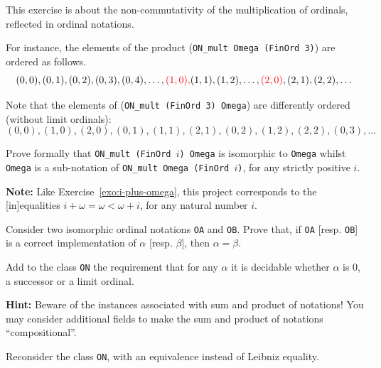 \label{exo:ON-mult}
\begin{project}

This exercise is about the non-commutativity of the multiplication of ordinals, reflected in ordinal notations.

For instance, the
elements of the product (\texttt{ON\_mult Omega (FinOrd 3)}) are ordered as follows.
\[(0,0),(0,1),(0,2),(0,3),(0,4),\dots,{\color{red}(1,0),} (1,1),(1,2),\dots, {\color{red}(2,0)},(2,1),(2,2),\dots\]

Note that the elements of  (\texttt{ON\_mult (FinOrd 3) Omega}) are differently ordered (without limit ordinals):
\[(0,0),(1,0),(2,0),(0,1),(1,1),(2,1),(0,2),(1,2),(2,2),(0,3),\dots\]


Prove formally  that \texttt{ON\_mult (FinOrd $i$) Omega} is isomorphic to
\texttt{Omega}  whilst
\texttt{Omega}  is a sub-notation of \texttt{ON\_mult Omega (FinOrd $i$)},
for any strictly positive $i$. 

\textbf{Note:} Like Exercise~\ref{exo:i-plus-omega}, this project corresponds to the [in]equalities $i+\omega=\omega<\omega+i$, for any natural number $i$.
\end{project}

\begin{project}
Consider two isomorphic ordinal notations \texttt{OA} and \texttt{OB}.
Prove that, if \texttt{OA} [resp. \texttt{OB}] is a correct implementation 
of $\alpha$ [resp. $\beta$], then $\alpha=\beta$.
\end{project}


\begin{project}
\label{project:succ-limit-dec}
Add to the class \texttt{ON} the requirement that for any $\alpha$ it is decidable whether $\alpha$ is $0$, a successor or a limit ordinal.


\textbf{Hint:}   Beware of the instances associated with sum and product of notations!
  You may consider additional fields 
to make the sum and product of notations ``compositional''.

\end{project}

\begin{project}
\label{project:on-setoid}
Reconsider the  class \texttt{ON}, with an equivalence instead of Leibniz equality.
\end{project}





